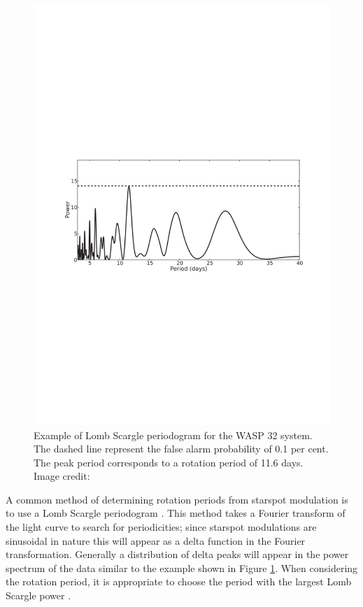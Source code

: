 \begin{figure}
    \centering
    \includegraphics[scale=0.5]{Figures/1-Introduction/brothwell_2014_LSP.pdf}
    \caption[Lomb Scargle periodogram example]{Example of Lomb Scargle periodogram for the WASP 32 system. The dashed line represent the false alarm probability of 0.1 per cent. The peak period corresponds to a rotation period of 11.6 days. Image credit: \citet{Brothwell_etal_2014}}
    \label{fig:LS_periodogram_example}
\end{figure}

A common method of determining rotation periods from starspot modulation is to use a Lomb Scargle periodogram \citep{Lomb_1976,Scargle_1982}. This method takes a Fourier transform of the light curve to search for periodicities; since starspot modulations are sinusoidal in nature this will appear as a delta function in the Fourier transformation. Generally a distribution of delta peaks will appear in the power spectrum of the data similar to the example shown in Figure \ref{fig:LS_periodogram_example}. When considering the rotation period, it is appropriate to choose the period with the largest Lomb Scargle power \citep{Nielsen_Karoff_2012}.

